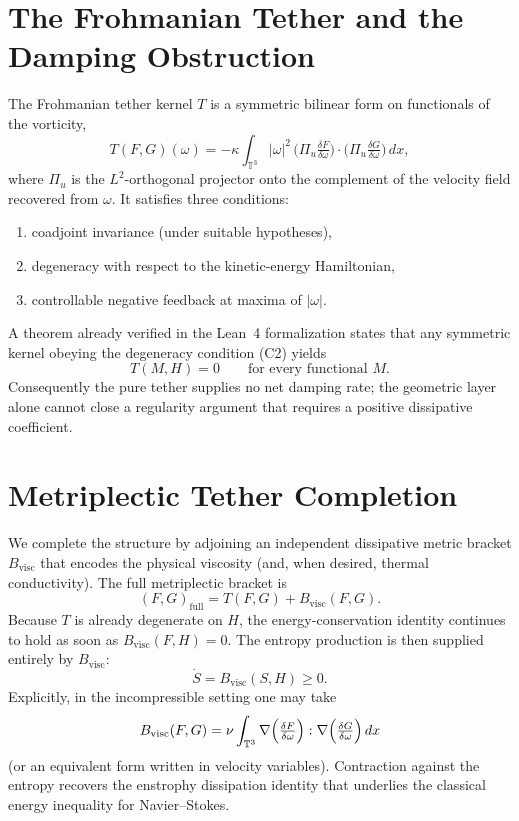 \documentclass[11pt,a4paper]{article}
\begin{document}
\section{The Frohmanian Tether and the Damping Obstruction}
The Frohmanian tether kernel \(T\) is a symmetric bilinear form on functionals of the vorticity,
\begin{equation}
T(F,G)(\omega) = -\kappa\int_{\mathbb{T}^3}|\omega|^2\,
\bigl(\Pi_u\tfrac{\delta F}{\delta\omega}\bigr)\cdot
\bigl(\Pi_u\tfrac{\delta G}{\delta\omega}\bigr)\,dx,
\end{equation}
where \(\Pi_u\) is the \(L^2\)-orthogonal projector onto the complement of the velocity field recovered from \(\omega\). It satisfies three conditions:
\begin{enumerate}[label=(C\arabic*)]
\item coadjoint invariance (under suitable hypotheses),
\item degeneracy with respect to the kinetic-energy Hamiltonian,
\item controllable negative feedback at maxima of \(|\omega|\).
\end{enumerate}
A theorem already verified in the Lean~4 formalization states that any symmetric kernel obeying the degeneracy condition (C2) yields
\begin{equation}
T(M,H)=0\qquad\text{for every functional }M.
\end{equation}
Consequently the pure tether supplies no net damping rate; the geometric layer alone cannot close a regularity argument that requires a positive dissipative coefficient.

\section{Metriplectic Tether Completion}
We complete the structure by adjoining an independent dissipative metric bracket \(B_{\mathrm{visc}}\) that encodes the physical viscosity (and, when desired, thermal conductivity). The full metriplectic bracket is
\begin{equation}
(F,G)_{\mathrm{full}} = T(F,G) + B_{\mathrm{visc}}(F,G).
\end{equation}
Because \(T\) is already degenerate on \(H\), the energy-conservation identity continues to hold as soon as \(B_{\mathrm{visc}}(F,H)=0\). The entropy production is then supplied entirely by \(B_{\mathrm{visc}}\):
\begin{equation}
\dot S = B_{\mathrm{visc}}(S,H)\ge0.
\end{equation}
Explicitly, in the incompressible setting one may take
\begin{equation}
B_{\mathrm{visc}}(F,G) = \nu\int_{\mathbb{T}^3}
\nabla\Bigl(\tfrac{\delta F}{\delta\omega}\Bigr):\nabla\Bigl(\tfrac{\delta G}{\delta\omega}\Bigr)\,dx
\end{equation}
(or an equivalent form written in velocity variables). Contraction against the entropy recovers the enstrophy dissipation identity that underlies the classical energy inequality for Navier--Stokes.
\end{document}

